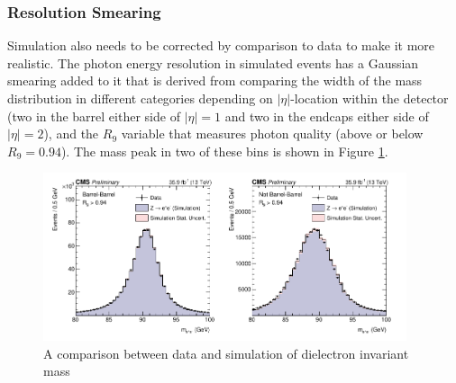\subsubsection{Resolution Smearing}
Simulation also needs to be corrected by comparison to data to make it more realistic. The photon energy resolution in simulated events has a Gaussian smearing added to it that is derived from comparing the width of the \Zee mass distribution in different categories depending on $|\eta|$-location within the detector (two in the barrel either side of $|\eta|=1$ and two in the endcaps either side of $|\eta|=2$), and the $R_{9}$ variable that measures photon quality (above or below $R_{9}=0.94$).
The mass peak in two of these bins is shown in Figure \ref{fig:object_reco:invariant_mass_validation}.
\begin{figure}[h!]
    \includegraphics[width=0.95\textwidth]{figures/object_reco/CMS-PAS-HIG-16-040_Figure_001.pdf}
    \caption{A comparison between data and simulation of dielectron invariant mass}
        \label{fig:object_reco:invariant_mass_validation}
\end{figure}

